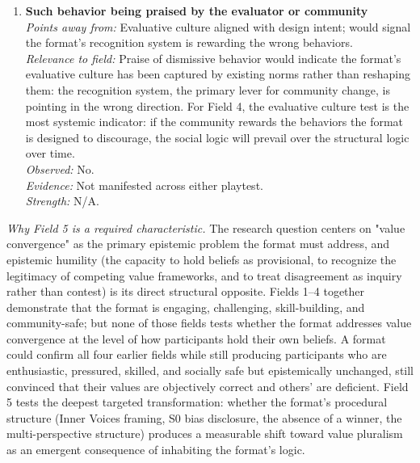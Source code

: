 \documentclass[12pt]{article}
\begin{document}
\begin{enumerate}
\item \textbf{Such behavior being praised by the evaluator or community}\\
\textit{Points away from:} Evaluative culture aligned with design intent; would signal the format's recognition system is rewarding the wrong behaviors.\\
\textit{Relevance to field:} Praise of dismissive behavior would indicate the format's evaluative culture has been captured by existing norms rather than reshaping them: the recognition system, the primary lever for community change, is pointing in the wrong direction. For Field 4, the evaluative culture test is the most systemic indicator: if the community rewards the behaviors the format is designed to discourage, the social logic will prevail over the structural logic over time.\\
\textit{Observed:} No.\\
\textit{Evidence:} Not manifested across either playtest.\\
\textit{Strength:} N/A.

\end{enumerate}

\bigskip


\noindent\textit{Why Field 5 is a required characteristic.} The research question centers on "value convergence" as the primary epistemic problem the format must address, and epistemic humility (the capacity to hold beliefs as provisional, to recognize the legitimacy of competing value frameworks, and to treat disagreement as inquiry rather than contest) is its direct structural opposite. Fields 1--4 together demonstrate that the format is engaging, challenging, skill-building, and community-safe; but none of those fields tests whether the format addresses value convergence at the level of how participants hold their own beliefs. A format could confirm all four earlier fields while still producing participants who are enthusiastic, pressured, skilled, and socially safe but epistemically unchanged, still convinced that their values are objectively correct and others' are deficient. Field 5 tests the deepest targeted transformation: whether the format's procedural structure (Inner Voices framing, S0 bias disclosure, the absence of a winner, the multi-perspective structure) produces a measurable shift toward value pluralism as an emergent consequence of inhabiting the format's logic.

\bigskip
\end{document}
